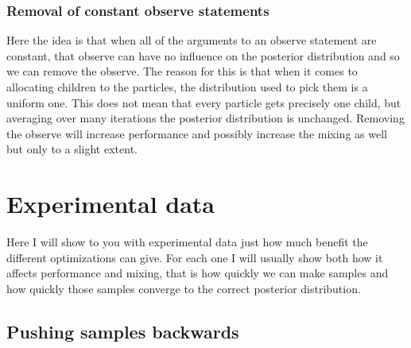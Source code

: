 \documentclass[a4paper]{article}
\begin{document}
\subsubsection{Removal of constant observe statements}

Here the idea is that when all of the arguments to an observe statement are constant, that observe can have no influence on the posterior distribution and so we can remove the observe. The reason for this is that when it comes to allocating children to the particles, the distribution used to pick them is a uniform one. This does not mean that every particle gets precisely one child, but averaging over many iterations the posterior distribution is unchanged. Removing the observe will increase performance and possibly increase the mixing as well but only to a slight extent.




\section{Experimental data}

Here I will show to you with experimental data just how much benefit the different optimizations can give. For each one I will usually show both how it affects performance and mixing, that is how quickly we can make samples and how quickly those samples converge to the correct posterior distribution.




\subsection{Pushing samples backwards}
\end{document}
